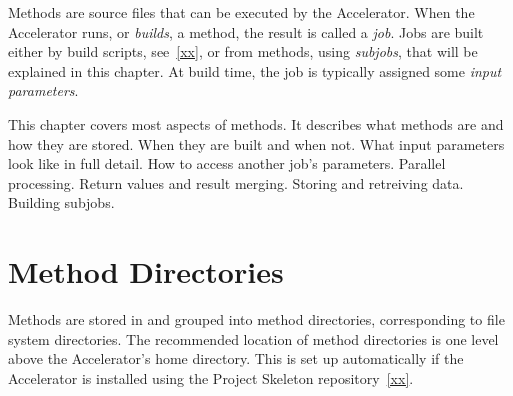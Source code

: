 


Methods are source files that can be executed by the Accelerator.
When the Accelerator runs, or \emph{builds}, a method, the result is
called a \emph{job}.  Jobs are built either by build scripts,
see~\ref{xx}, or from methods, using \emph{subjobs}, that will be
explained in this chapter.  At build time, the job is typically
assigned some \emph{input parameters}.

This chapter covers most aspects of methods.  It describes what
methods are and how they are stored.  When they are built and when
not.  What input parameters look like in full detail.  How to access
another job's parameters.  Parallel processing.  Return values and
result merging.  Storing and retreiving data.  Building subjobs.


\section{Method Directories}

Methods are stored in and grouped into method directories,
corresponding to file system directories.  The recommended location of
method directories is one level above the Accelerator's home
directory.  This is set up automatically if the Accelerator is
installed using the Project Skeleton repository~\ref{xx}.

